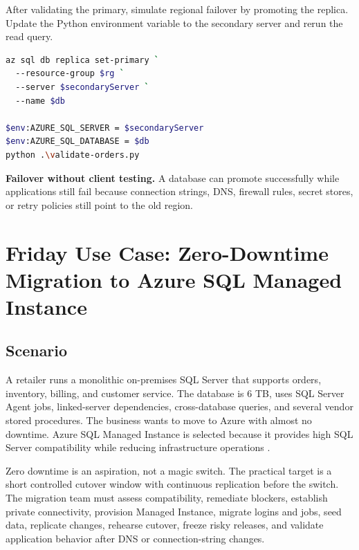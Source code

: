 After validating the primary, simulate regional failover by promoting the replica. Update the Python environment variable to the secondary server and rerun the read query.

\begin{lstlisting}[language=bash,caption={Simulating regional failover by promoting the geo-replica.},label={lst:ch2-sql-failover-cli}]
az sql db replica set-primary `
  --resource-group $rg `
  --server $secondaryServer `
  --name $db

$env:AZURE_SQL_SERVER = $secondaryServer
$env:AZURE_SQL_DATABASE = $db
python .\validate-orders.py
\end{lstlisting}

\begin{pitfall}
\textbf{Failover without client testing.} A database can promote successfully while applications still fail because connection strings, DNS, firewall rules, secret stores, or retry policies still point to the old region.
\end{pitfall}

\section{Friday Use Case: Zero-Downtime Migration to Azure SQL Managed Instance}

\subsection{Scenario}
A retailer runs a monolithic on-premises SQL Server that supports orders, inventory, billing, and customer service. The database is 6 TB, uses SQL Server Agent jobs, linked-server dependencies, cross-database queries, and several vendor stored procedures. The business wants to move to Azure with almost no downtime. Azure SQL Managed Instance is selected because it provides high SQL Server compatibility while reducing infrastructure operations \cite{microsoft2025sqlmi}.

Zero downtime is an aspiration, not a magic switch. The practical target is a short controlled cutover window with continuous replication before the switch. The migration team must assess compatibility, remediate blockers, establish private connectivity, provision Managed Instance, migrate logins and jobs, seed data, replicate changes, rehearse cutover, freeze risky releases, and validate application behavior after DNS or connection-string changes.

